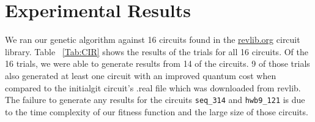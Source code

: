 \section{Experimental Results}

We ran our genetic algorithm against 16 circuits found in the \url{revlib.org} circuit library. Table ~\ref{Tab:CIR} shows the 
results of the trials for all 16 circuits. Of the 16 trials, we were able to generate results from 14 of the circuits. 9 of those 
trials also generated at least one circuit with an improved quantum cost when compared to the initialgit  circuit's .real file which 
was downloaded from revlib. The failure to generate any results for the circuits \verb!seq_314! and \verb!hwb9_121! is due to the 
time complexity of our fitness function and the large size of those circuits. 

